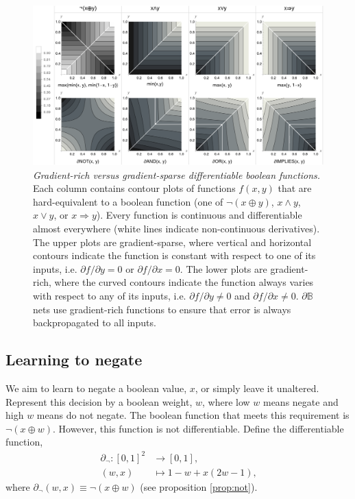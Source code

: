\documentclass{article} %
\begin{document}
\begin{figure}[t!]
	\centering
	\includegraphics[trim=0pt 0pt 0pt 0pt, clip, width=1.0\textwidth]{logic-gates.png}
	\caption{{\em Gradient-rich versus gradient-sparse differentiable boolean functions.} Each column contains contour plots of functions $f(x,y)$ that are hard-equivalent to a boolean function (one of $\neg(x \oplus y)$, $x \wedge y$, $x \vee y$, or $x \Rightarrow y$). Every function is continuous and differentiable almost everywhere (white lines indicate non-continuous derivatives). The upper plots are gradient-sparse, where vertical and horizontal contours indicate the function is constant with respect to one of its inputs, i.e. $\partial f/\partial y = 0$ or $\partial f/\partial x = 0$. The lower plots are gradient-rich, where the curved contours indicate the function always varies with respect to any of its inputs, i.e. $\partial f/\partial y \neq 0$ and $\partial f/\partial x \neq 0$. $\partial \mathbb{B}$ nets use gradient-rich functions to ensure that error is always backpropagated to all inputs.} 
	\label{fig:gradient-rich}
\end{figure}

\subsection{Learning to negate}

We aim to learn to negate a boolean value, $x$, or simply leave it unaltered. Represent this decision by a boolean weight, $w$, where low $w$ means negate and high $w$ means do not negate. The boolean function that meets this requirement is $\neg(x \oplus w)$. However, this function is not differentiable. Define the differentiable function,
	\begin{equation*}
	\begin{aligned}
	\partial_{\neg}: [0, 1]^{2} &\to [0,1], \\
	(w, x) &\mapsto 1 - w + x (2w - 1)\text{,}
	\end{aligned}
	\end{equation*}
where $\partial_{\neg}(w, x) \equiv \neg(x \oplus w)$ (see proposition \ref{prop:not}).
\end{document}
